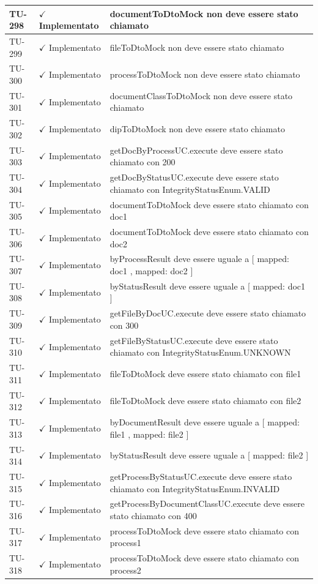 ﻿\documentclass[a4paper,12pt]{article}
\newcommand{\ok}{\textcolor{green!60!black}{$\checkmark$ Implementato}}
\begin{document}
\begin{longtable}{|p{2cm}|p{3.5cm}|p{9.5cm}|}
\hline
TU-298 & \ok & documentToDtoMock non deve essere stato chiamato \\
\hline
TU-299 & \ok & fileToDtoMock non deve essere stato chiamato \\
\hline
TU-300 & \ok & processToDtoMock non deve essere stato chiamato \\
\hline
TU-301 & \ok & documentClassToDtoMock non deve essere stato chiamato \\
\hline
TU-302 & \ok & dipToDtoMock non deve essere stato chiamato \\
\hline
TU-303 & \ok & getDocByProcessUC.execute deve essere stato chiamato con 200 \\
\hline
TU-304 & \ok & getDocByStatusUC.execute deve essere stato chiamato con IntegrityStatusEnum.VALID \\
\hline
TU-305 & \ok & documentToDtoMock deve essere stato chiamato con doc1 \\
\hline
TU-306 & \ok & documentToDtoMock deve essere stato chiamato con doc2 \\
\hline
TU-307 & \ok & byProcessResult deve essere uguale a [{ mapped: doc1 }, { mapped: doc2 }] \\
\hline
TU-308 & \ok & byStatusResult deve essere uguale a [{ mapped: doc1 }] \\
\hline
TU-309 & \ok & getFileByDocUC.execute deve essere stato chiamato con 300 \\
\hline
TU-310 & \ok & getFileByStatusUC.execute deve essere stato chiamato con IntegrityStatusEnum.UNKNOWN \\
\hline
TU-311 & \ok & fileToDtoMock deve essere stato chiamato con file1 \\
\hline
TU-312 & \ok & fileToDtoMock deve essere stato chiamato con file2 \\
\hline
TU-313 & \ok & byDocumentResult deve essere uguale a [{ mapped: file1 }, { mapped: file2 }] \\
\hline
TU-314 & \ok & byStatusResult deve essere uguale a [{ mapped: file2 }] \\
\hline
TU-315 & \ok & getProcessByStatusUC.execute deve essere stato chiamato con IntegrityStatusEnum.INVALID \\
\hline
TU-316 & \ok & getProcessByDocumentClassUC.execute deve essere stato chiamato con 400 \\
\hline
TU-317 & \ok & processToDtoMock deve essere stato chiamato con process1 \\
\hline
TU-318 & \ok & processToDtoMock deve essere stato chiamato con process2 \\

\end{longtable}
\end{document}
